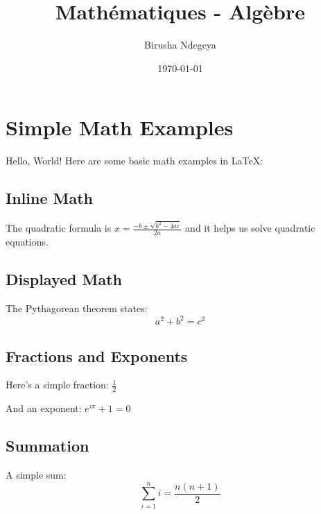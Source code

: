 \documentclass{article}
\title{Mathématiques - Algèbre}
\author{Birusha Ndegeya}
\date{\today}
\begin{document}
\maketitle

\section{Simple Math Examples}

Hello, World! Here are some basic math examples in \LaTeX:

\subsection{Inline Math}
The quadratic formula is $x = \frac{-b \pm \sqrt{b^2 - 4ac}}{2a}$ and it helps
us solve quadratic equations.

\subsection{Displayed Math}
The Pythagorean theorem states:
\begin{equation}
  a^2 + b^2 = c^2
\end{equation}

\subsection{Fractions and Exponents}
Here's a simple fraction: $\frac{1}{2}$

And an exponent: $e^{i\pi} + 1 = 0$

\subsection{Summation}
A simple sum:
\begin{equation}
  \sum_{i=1}^{n} i = \frac{n(n+1)}{2}
\end{equation}
\end{document}
